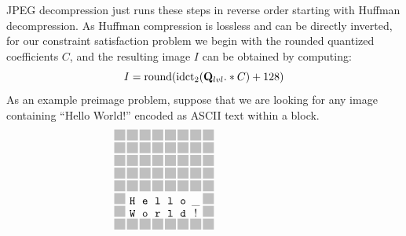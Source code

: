 \newcommand{\gbox}[0]{\textcolor{black!50!white!50}{\rule{10pt}{10pt}}}
\newcommand{\mtt}[1]{\mathtt{#1}}

JPEG decompression just runs these steps in reverse order starting
with Huffman decompression.  As Huffman compression is lossless and
can be directly inverted, for our constraint satisfaction problem we
begin with the rounded quantized coefficients $C$, and the resulting
image $I$ can be obtained by computing:
%
\[I = \mathrm{round}(\mathrm{idct}_2(\mathbf{Q}_{lvl} .* C) + 128)\]
%
As an example preimage problem, suppose that we are looking for any
image containing ``Hello World!'' encoded as ASCII text within a block.
%
\begin{equation}
\begin{array}{c@{\hspace{1.5pt}}c@{\hspace{1.5pt}}c@{\hspace{1.5pt}}c@{\hspace{1.5pt}}c@{\hspace{1.5pt}}c@{\hspace{1.5pt}}c@{\hspace{1.5pt}}c}
\gbox & \gbox & \gbox & \gbox & \gbox & \gbox & \gbox & \gbox\\[-2pt]
\gbox & \gbox & \gbox & \gbox & \gbox & \gbox & \gbox & \gbox\\[-2pt]
\gbox & \gbox & \gbox & \gbox & \gbox & \gbox & \gbox & \gbox\\[-2pt]
\gbox & \gbox & \gbox & \gbox & \gbox & \gbox & \gbox & \gbox\\[-2pt]
\gbox & \gbox & \gbox & \gbox & \gbox & \gbox & \gbox & \gbox\\[-2pt]
\gbox & \mtt{H} & \mtt{e} & \mtt{l} & \mtt{l} & \mtt{o} & \mtt{\_} & \gbox\\[-2pt]
\gbox & \mtt{W} & \mtt{o} & \mtt{r} & \mtt{l} & \mtt{d} & \mtt{!} & \gbox\\[-2pt]
\gbox & \gbox & \gbox & \gbox & \gbox & \gbox & \gbox & \gbox\\[-2pt]
\end{array}
\hspace{1in}
\begin{array}{c@{\hspace{1.5pt}}c@{\hspace{1.5pt}}c@{\hspace{1.5pt}}c@{\hspace{1.5pt}}c@{\hspace{1.5pt}}c@{\hspace{1.5pt}}c@{\hspace{1.5pt}}c}

\end{array}
\end{equation}
